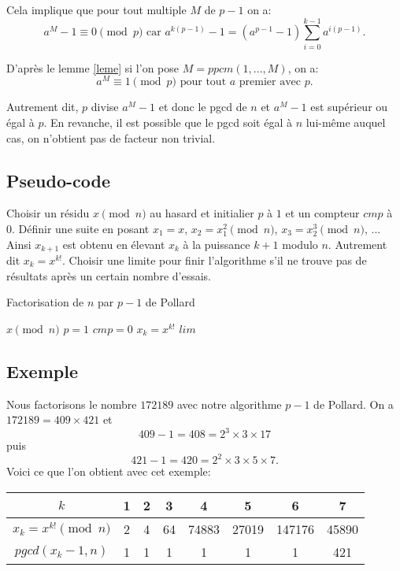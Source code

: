 \documentclass[french, 12pt, titlepage]{article}
\begin{document}
Cela implique que pour tout multiple $M$ de $p-1$ on a: \[ a^M - 1 \equiv 0 \pmod p \text{ car } a^{k(p-1)} - 1 = (a^{p-1} - 1 )\sum\limits_{i=0}^{k-1} a^{i(p-1)} . \]

D'après le lemme \ref{leme} si l'on pose $M = ppcm(1, ..., M)$, on a: \[ a^M \equiv 1 \pmod p \text{ pour tout } a \text{ premier avec } p . \]

Autrement dit, $p$ divise $a^M - 1$ et donc le pgcd de $n$ et $a^M - 1$ est supérieur ou égal à $p$.
En revanche, il est possible que le pgcd soit égal à $n$ lui-même auquel cas, on n'obtient pas de facteur non trivial.

\subsection{Pseudo-code}

Choisir un résidu $x \pmod n$ au hasard et initialier $p$ à $1$ et un compteur $cmp$ à $0.$
Définir une suite en posant $x_1 = x$, $x_2 = x_1^2 \pmod n$, $x_3 = x_2^3 \pmod n$, ... Ainsi $x_ {k+1}$ est obtenu en élevant $x_k$ à la puissance $k+1$ modulo $n$. Autrement dit $x_k = x^{k!}$.
Choisir une limite pour finir l'algorithme s'il ne trouve pas de résultats après un certain nombre d'essais.

\begin{algorithm}
\caption{Factorisation de $n$ par $p-1$ de Pollard}
\BlankLine
$x \pmod n$\;
$p = 1$\;
$cmp = 0$\;
$x_k = x^{k!}$\;
$lim$\;
\end{algorithm}

\subsection{Exemple}

Nous factorisons le nombre $172189$ avec notre algorithme $p-1$ de Pollard.
On a $172189 = 409 \times 421$ et \[409 - 1 = 408 = 2^3 \times 3 \times 17 \] puis \[421-1 = 420 = 2^2 \times 3 \times 5 \times 7.\] 
Voici ce que l'on obtient avec cet exemple:

\begin{center}
\begin{tabular}{|c||c|c|c|c|c|c|c|}
\hline
$k$ & 1 & 2 & 3 & 4 & 5 & 6 & 7 \\
\hline
$x_k = x^{k!} \pmod n$ & 2 & 4 & 64 & 74883 & 27019 & 147176 & 45890 \\
\hline
$pgcd(x_k -1, n)$ & 1 & 1 & 1 & 1 & 1 & 1 & 421\\
\hline
\end{tabular}
\end{center}
\end{document}
